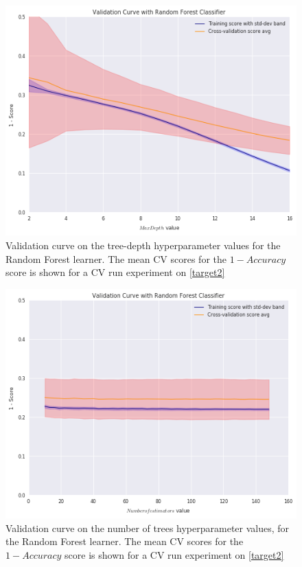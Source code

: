 \begin{figure}[h!]
    \begin{center}
     \includegraphics[width=1\linewidth]{figures/random-forest/validation_curve_forest_depth_series_f1}
        \caption{ Validation curve on the tree-depth hyperparameter values for the Random Forest  learner.
            The mean CV scores for the $1 - Accuracy$ score is shown for a CV run experiment on \cref{target2}}
        \label{fig:random_forest_validation_curves_depth_trees}

    \end{center}
\end{figure}

\begin{figure}[h!]
    \begin{center}
        \includegraphics[width=1\linewidth]{figures/random-forest/validation_curve_forest_num_trees_series_f1}
            \caption{ Validation curve on the number of trees hyperparameter values, for the Random Forest  learner.
                The mean CV scores for the $1 - Accuracy$ score is shown for a CV run experiment on \cref{target2}}
        \label{fig:random_forest_validation_curves_num_trees}
    \end{center}
\end{figure}

